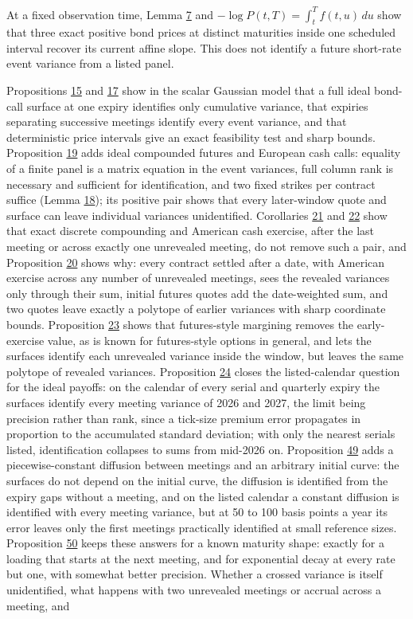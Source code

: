 \documentclass[11pt]{article}
\begin{document}
At a fixed observation time, Lemma \hyperref[res:Lemma-7]{7} and \(-\log P(t,T)=\int_t^T f(t,u)\,du\) show that three exact positive bond prices at distinct maturities inside one scheduled interval recover its current affine slope. This does not identify a future short-rate event variance from a listed panel.

Propositions \hyperref[res:Proposition-15]{15} and \hyperref[res:Proposition-17]{17} show in the scalar Gaussian model that a full ideal bond-call surface at one expiry identifies only cumulative variance, that expiries separating successive meetings identify every event variance, and that deterministic price intervals give an exact feasibility test and sharp bounds. Proposition \hyperref[res:Proposition-19]{19} adds ideal compounded futures and European cash calls: equality of a finite panel is a matrix equation in the event variances, full column rank is necessary and sufficient for identification, and two fixed strikes per contract suffice (Lemma \hyperref[res:Lemma-18]{18}); its positive pair shows that every later-window quote and surface can leave individual variances unidentified. Corollaries \hyperref[res:Corollary-21]{21} and \hyperref[res:Corollary-22]{22} show that exact discrete compounding and American cash exercise, after the last meeting or across exactly one unrevealed meeting, do not remove such a pair, and Proposition \hyperref[res:Proposition-20]{20} shows why: every contract settled after a date, with American exercise across any number of unrevealed meetings, sees the revealed variances only through their sum, initial futures quotes add the date-weighted sum, and two quotes leave exactly a polytope of earlier variances with sharp coordinate bounds. Proposition \hyperref[res:Proposition-23]{23} shows that futures-style margining removes the early-exercise value, as is known for futures-style options in general, and lets the surfaces identify each unrevealed variance inside the window, but leaves the same polytope of revealed variances. Proposition \hyperref[res:Proposition-24]{24} closes the listed-calendar question for the ideal payoffs: on the calendar of every serial and quarterly expiry the surfaces identify every meeting variance of 2026 and 2027, the limit being precision rather than rank, since a tick-size premium error propagates in proportion to the accumulated standard deviation; with only the nearest serials listed, identification collapses to sums from mid-2026 on. Proposition \hyperref[res:Proposition-49]{49} adds a piecewise-constant diffusion between meetings and an arbitrary initial curve: the surfaces do not depend on the initial curve, the diffusion is identified from the expiry gaps without a meeting, and on the listed calendar a constant diffusion is identified with every meeting variance, but at 50 to 100 basis points a year its error leaves only the first meetings practically identified at small reference sizes. Proposition \hyperref[res:Proposition-50]{50} keeps these answers for a known maturity shape: exactly for a loading that starts at the next meeting, and for exponential decay at every rate but one, with somewhat better precision. Whether a crossed variance is itself unidentified, what happens with two unrevealed meetings or accrual across a meeting, and 
\end{document}
